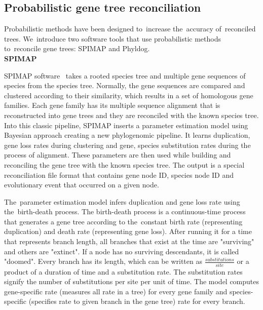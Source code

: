 \subsection{Probabilistic gene tree reconciliation}
Probabilistic methods have been designed to~increase the~accuracy of~reconciled trees. We~introduce two software tools that use probabilistic methods to~reconcile gene trees: SPIMAP and Phyldog.\\
\textbf{SPIMAP}

SPIMAP software~\cite{spimap_online} takes a rooted species tree and multiple gene sequences of species from the species tree. Normally, the gene sequences are compared and clustered according to their similarity, which results in a set of homologous gene families. Each gene family has its multiple sequence alignment that is reconstructed into gene trees and they are reconciled with the known species tree. Into this classic pipeline, SPIMAP inserts a parameter estimation model using Bayesian approach creating a new phylogenomic pipeline. It learns duplication, gene loss rates during clustering and gene, species substitution rates during the process of alignment. These parameters are then used while building and reconciling the gene tree with the known species tree. The output is a special reconciliation file format that contains gene node ID, species node ID and evolutionary event that occurred on a given node.

The~parameter estimation model \cite{spimap} infers duplication and gene loss rate using the~birth-death process. The birth-death process is a continuous-time process that generates a gene tree according to the~constant birth rate (representing duplication) and death rate (representing gene loss). After running it for a time that represents branch length, all branches that exist at the time are "surviving" and others are "extinct". If a node has no surviving descendants, it is called "doomed". Every branch has its length, which can be written as  \( \frac{substitutions}{site} \) or a product of a duration of time and a substitution rate. The substitution rates signify the number of substitutions per site per unit of time. The model computes gene-specific rate (measures all rate in a tree) for every gene family and species-specific (specifies rate to given branch in the gene tree) rate for every branch.

